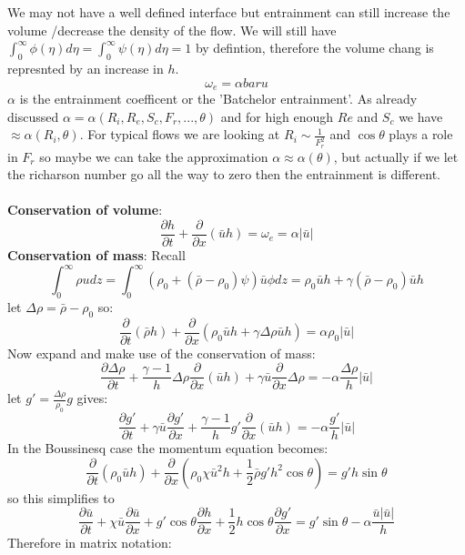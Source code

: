 \documentclass{article}
\begin{document}
We may not have a well defined interface but entrainment can still increase the volume /decrease the density of the flow. We will still have $\int_0^{\infty} \phi(\eta) d \eta = \int_0^{\infty} \psi( \eta ) d\eta = 1$ by defintion, therefore the volume chang is represnted by an increase in $h$.
$$
 \omega_{e} = \alpha bar u
$$
$\alpha$ is the entrainment coefficent or the 'Batchelor entrainment'. As already discussed $\alpha = \alpha (R_i , R_e, S_c, F_r,..., \theta)$ and for high enough $Re$ and $S_c$ we have $\approx \alpha(R_i, \theta)$. For typical flows we are looking at $R_i \sim \frac{1}{F_r^2}$ and $\cos \theta$ plays a role in $F_r$ so maybe we can take the approximation $\alpha \approx \alpha(\theta)$, but actually if we let the richarson number go all the way to zero then the entrainment is different.\\\\
\textbf{Conservation of volume}:
$$
 \frac{\partial h}{\partial t} + \frac{\partial}{\partial x} ( \bar u h) = \omega_e = \alpha | \bar u|
$$
\textbf{Conservation of mass}: Recall
$$
\int_0^{\infty} \rho u dz = \int^{\infty}_0 ( \rho_0 + ( \bar \rho - \rho_0) \psi) \bar u \phi dz = \rho_0 \bar u h + \gamma ( \bar \rho - \rho_0 ) \bar u h 
$$
let $\Delta \rho = \bar \rho - \rho_0$ so:
$$
 \frac{\partial}{\partial t}( \bar \rho h) + \frac{\partial}{\partial x} ( \rho_0 \bar u h + \gamma \Delta \rho \bar u h) = \alpha \rho_0 | \bar u|
$$
Now expand and make use of the conservation of mass:
$$
 \frac{\partial \Delta \rho}{\partial t} + \frac{\gamma -1}{h} \Delta \rho \frac{\partial}{\partial x} ( \bar u h) + \gamma \bar u  \frac{\partial}{\partial x} \Delta \rho = - \alpha \frac{\Delta \rho}{h} | \bar u|
$$
let $g' = \frac{\Delta \rho}{\rho_0} g$ gives:
$$
 \frac{\partial g'}{\partial t} + \gamma \bar u \frac{\partial g'}{\partial x} + \frac{\gamma -1}{h} g' \frac{\partial}{\partial x} ( \bar u h) = - \alpha \frac{g'}{h} | \bar u |
$$
In the Boussinesq case the momentum equation becomes:
$$
 \frac{\partial}{\partial t} ( \rho_0 \bar u h) + \frac{\partial}{\partial x} ( \rho_0 \chi \bar u^2 h + \frac{ 1}{2} \bar \rho g' h^2 \cos \theta) = g' h \sin \theta
$$
so this simplifies to
$$
\frac{\partial \bar u}{\partial t} + \chi \bar u \frac{\partial \bar u}{\partial x} + g' \cos \theta \frac{\partial h}{\partial x} + \frac{1}{2} h \cos \theta \frac{\partial g'}{\partial x} = g' \sin \theta - \alpha \frac{\bar u | \bar u|}{h}
$$
Therefore in matrix notation:
\end{document}
